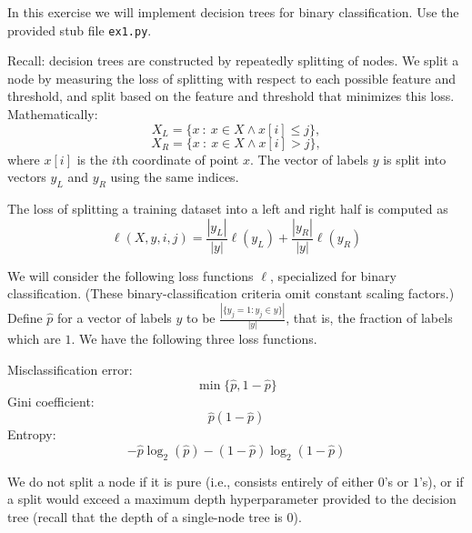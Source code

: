 \documentclass[10pt,letterpaper]{article}
\begin{document}
\begin{exercise}
  In this exercise we will implement decision trees for binary classification.
  Use the provided stub file \texttt{ex1.py}.

  Recall: decision trees are constructed by repeatedly splitting of nodes.
  We split a node by measuring the loss of splitting with respect to each possible feature and threshold, and split based on the feature and threshold that minimizes this loss.
  Mathematically:
  \[X_L = \{x\ :\ x \in X \wedge  x[i] \leq j\},\]
  \[X_R = \{x\ :\ x \in X \wedge  x[i] > j\},\]
  where $x[i]$ is the $i$th coordinate of point $x$.
  The vector of labels $y$ is split into vectors $y_L$ and $y_R$ using the same indices.

  The loss of splitting a training dataset into a left and right half is computed as
  \[\ell(X,y,i,j) = \frac{|y_L|}{|y|}\ell(y_L) + \frac{|y_R|}{|y|}\ell(y_R) \]

  We will consider the following loss functions $\ell$, specialized for binary classification. (These binary-classification criteria omit constant scaling factors.)
  Define $\hat p$ for a vector of labels $y$ to be $\frac{|\{y_j = 1 : y_j \in y\}|}{|y|}$, that is, the fraction of labels which are $1$.
  We have the following three loss functions.

  \noindent Misclassification error:
  \[\min \{\hat p, 1-\hat p\}\]
  Gini coefficient:
  \[\hat p (1 - \hat p)\]
  Entropy:
  \[- \hat p \log_2 (\hat p) - (1 - \hat p) \log_2 (1 - \hat p ) \]

  We do not split a node if it is pure (i.e., consists entirely of either $0$'s or $1$'s), or if a split would exceed a maximum depth hyperparameter provided to the decision tree (recall that the depth of a single-node tree is $0$).




\end{exercise}
\end{document}
